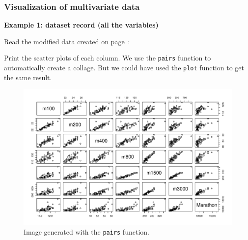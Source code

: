 \documentclass[a4paper]{article}
\newcommand{\example}[1]{\textcolor{Green4}{\textbf{#1}}}
\begin{document}
    \newpage

    \subsubsection{Visualization of multivariate data}

    \begin{flushleft}
        \example{Example 1: dataset record (all the variables)}
    \end{flushleft}
    Read the modified data created on page~\pageref{code: read.table - modded}:
    
    Print the scatter plots of each column. We use the \texttt{pairs} function to automatically create a collage. But we could have used the \texttt{plot} function to get the same result.
    
    \begin{figure}[!htp]
        \centering
        \includegraphics[width=\textwidth]{img/visualization-of-multivariate-data-1.pdf}
        \caption*{Image generated with the \texttt{pairs} function.}
    \end{figure}

    \newpage
\end{document}
